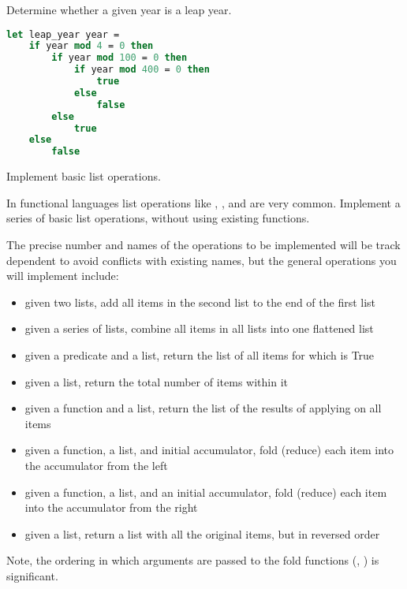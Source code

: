 Determine whether a given year is a leap year.

\begin{lstlisting}[language=OCaml]
let leap_year year =
    if year mod 4 = 0 then
        if year mod 100 = 0 then
            if year mod 400 = 0 then
                true
            else
                false
        else
            true
    else
        false
\end{lstlisting}

Implement basic list operations.

In functional languages list operations like , , and  are very common.
Implement a series of basic list operations, without using existing functions.

The precise number and names of the operations to be implemented will be track dependent to avoid conflicts with existing names, but the general operations you will implement include:
\begin{itemize}
  \item {} given two lists, add all items in the second list to the end of the first list
  \item {} given a series of lists, combine all items in all lists into one flattened list
  \item {} given a predicate and a list, return the list of all items for which  is True
  \item {} given a list, return the total number of items within it
  \item {} given a function and a list, return the list of the results of applying  on all items
  \item {} given a function, a list, and initial accumulator, fold (reduce) each item into the accumulator from the left
  \item {} given a function, a list, and an initial accumulator, fold (reduce) each item into the accumulator from the right
  \item {} given a list, return a list with all the original items, but in reversed order
\end{itemize}

Note, the ordering in which arguments are passed to the fold functions (, ) is significant.

